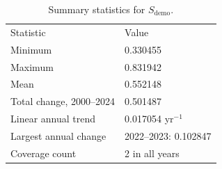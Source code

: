 \begin{table}[tb]
\caption{\label{tab:demo_summary}Summary statistics for \(S_{\mathrm{demo}}\).}
\footnotesize
\begin{ruledtabular}
\begin{tabular}{ll}
Statistic & Value \\
Minimum & 0.330455 \\
Maximum & 0.831942 \\
Mean & 0.552148 \\
Total change, 2000--2024 & 0.501487 \\
Linear annual trend & 0.017054 yr\(^{-1}\) \\
Largest annual change & 2022--2023: 0.102847 \\
Coverage count & 2 in all years \\
\end{tabular}
\end{ruledtabular}
\end{table}
